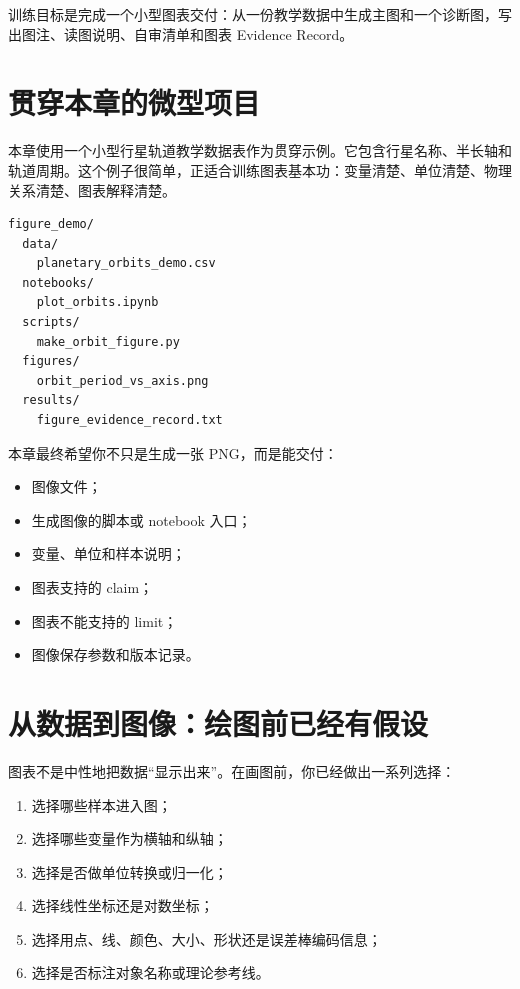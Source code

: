 训练目标是完成一个小型图表交付：从一份教学数据中生成主图和一个诊断图，写出图注、读图说明、自审清单和图表 Evidence Record。

\section{贯穿本章的微型项目}

本章使用一个小型行星轨道教学数据表作为贯穿示例。它包含行星名称、半长轴和轨道周期。这个例子很简单，正适合训练图表基本功：变量清楚、单位清楚、物理关系清楚、图表解释清楚。

\begin{examplebox}[最小图表项目结构]
\begin{lstlisting}[style=terminal]
figure_demo/
  data/
    planetary_orbits_demo.csv
  notebooks/
    plot_orbits.ipynb
  scripts/
    make_orbit_figure.py
  figures/
    orbit_period_vs_axis.png
  results/
    figure_evidence_record.txt
\end{lstlisting}
\end{examplebox}

本章最终希望你不只是生成一张 PNG，而是能交付：

\begin{itemize}
    \item 图像文件；
    \item 生成图像的脚本或 notebook 入口；
    \item 变量、单位和样本说明；
    \item 图表支持的 claim；
    \item 图表不能支持的 limit；
    \item 图像保存参数和版本记录。
\end{itemize}

\section{从数据到图像：绘图前已经有假设}

图表不是中性地把数据“显示出来”。在画图前，你已经做出一系列选择：

\begin{enumerate}
    \item 选择哪些样本进入图；
    \item 选择哪些变量作为横轴和纵轴；
    \item 选择是否做单位转换或归一化；
    \item 选择线性坐标还是对数坐标；
    \item 选择用点、线、颜色、大小、形状还是误差棒编码信息；
    \item 选择是否标注对象名称或理论参考线。
\end{enumerate}

